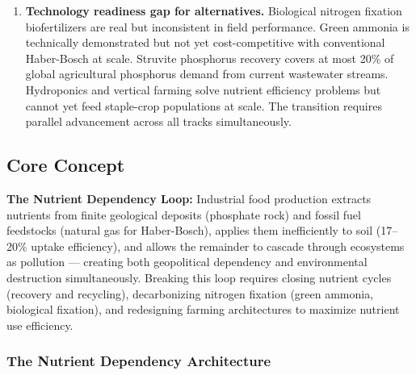 \documentclass[11pt,letterpaper]{article}
\begin{document}
\begin{enumerate}[leftmargin=1.5em]
\item \textbf{Technology readiness gap for alternatives.} Biological nitrogen fixation biofertilizers are real but inconsistent in field performance. Green ammonia is technically demonstrated but not yet cost-competitive with conventional Haber-Bosch at scale. Struvite phosphorus recovery covers at most 20\% of global agricultural phosphorus demand from current wastewater streams. Hydroponics and vertical farming solve nutrient efficiency problems but cannot yet feed staple-crop populations at scale. The transition requires parallel advancement across all tracks simultaneously.

\end{enumerate}

\subsection{Core Concept}

\begin{quotebox}
\textbf{The Nutrient Dependency Loop:} Industrial food production extracts nutrients from finite geological deposits (phosphate rock) and fossil fuel feedstocks (natural gas for Haber-Bosch), applies them inefficiently to soil (17--20\% uptake efficiency), and allows the remainder to cascade through ecosystems as pollution --- creating both geopolitical dependency and environmental destruction simultaneously. Breaking this loop requires closing nutrient cycles (recovery and recycling), decarbonizing nitrogen fixation (green ammonia, biological fixation), and redesigning farming architectures to maximize nutrient use efficiency.
\end{quotebox}

\vspace{1em}

\subsubsection{The Nutrient Dependency Architecture}
\end{document}
